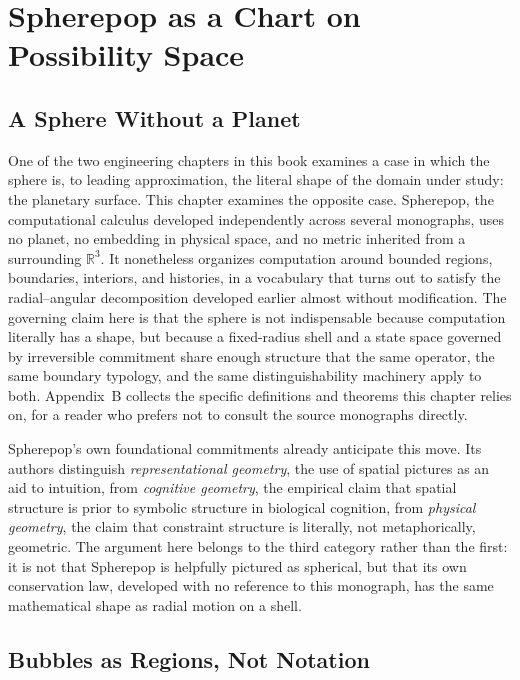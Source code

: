 \documentclass[11pt,fleqn]{book}
\numberwithin{equation}{chapter}
\theoremstyle{plain}
\theoremstyle{definition}
\theoremstyle{remark}
\newcommand{\R}{\mathbb{R}}
\begin{document}
\chapter{Spherepop as a Chart on Possibility Space}

\section{A Sphere Without a Planet}

One of the two engineering chapters in this book examines a case in which the sphere is, to leading approximation, the literal shape of the domain under study: the planetary surface. This chapter examines the opposite case. Spherepop, the computational calculus developed independently across several monographs, uses no planet, no embedding in physical space, and no metric inherited from a surrounding \(\R^3\). It nonetheless organizes computation around bounded regions, boundaries, interiors, and histories, in a vocabulary that turns out to satisfy the radial--angular decomposition developed earlier almost without modification. The governing claim here is that the sphere is not indispensable because computation literally has a shape, but because a fixed-radius shell and a state space governed by irreversible commitment share enough structure that the same operator, the same boundary typology, and the same distinguishability machinery apply to both. Appendix~B collects the specific definitions and theorems this chapter relies on, for a reader who prefers not to consult the source monographs directly.

Spherepop's own foundational commitments already anticipate this move. Its authors distinguish \emph{representational geometry}, the use of spatial pictures as an aid to intuition, from \emph{cognitive geometry}, the empirical claim that spatial structure is prior to symbolic structure in biological cognition, from \emph{physical geometry}, the claim that constraint structure is literally, not metaphorically, geometric. The argument here belongs to the third category rather than the first: it is not that Spherepop is helpfully pictured as spherical, but that its own conservation law, developed with no reference to this monograph, has the same mathematical shape as radial motion on a shell.

\section{Bubbles as Regions, Not Notation}
\end{document}
